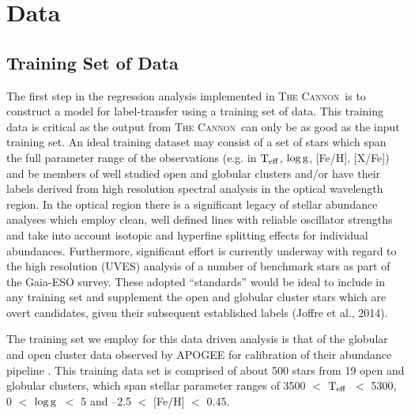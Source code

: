\documentclass[12pt, preprint]{aastex}
\newcommand{\teff}{\mbox{$\rm T_{eff}$}}
\newcommand{\logg}{\mbox{$\rm \log g$}}
\newcommand{\tc}{\textsc{The Cannon}}
\begin{document}
\break 

\section{Data}

\subsection{Training Set of Data}

The first step in the regression analysis implemented  in \tc\ is to construct a model for label-transfer using a training set of data. This training data is critical as the output from \tc\ can only be as good as the input training set. An ideal training dataset may consist of a set of stars which span the full parameter range of the observations (e.g. in \teff, \logg, [Fe/H], [X/Fe]) and be members of well studied open and globular clusters and/or have their labels derived from high resolution spectral analysis in the optical wavelength region. In the optical region there is a significant legacy of stellar abundance analyses which employ clean, well defined lines with reliable oscillator strengths and take into account isotopic and hyperfine splitting effects for individual abundances. Furthermore, significant effort is currently underway with regard to the high resolution (UVES) analysis of a number of benchmark stars as part of the Gaia-ESO survey. These adopted ``standards'' would be ideal to include in any training set and supplement the open and globular cluster stars which are overt candidates, given their subsequent established labels (Joffre et al., 2014). %

The training set we employ for this data driven analysis is that of the globular and open cluster data observed by APOGEE for calibration of their abundance pipeline \citep{Meszaros2013}. This training data set is comprised of about 500 stars from 19 open and globular clusters, which span stellar parameter ranges of 3500 $<$ \teff\ $<$ 5300, 0 $<$ \logg\ $<$ 5 and --2.5 $<$ [Fe/H] $<$ 0.45. 

\end{document}
